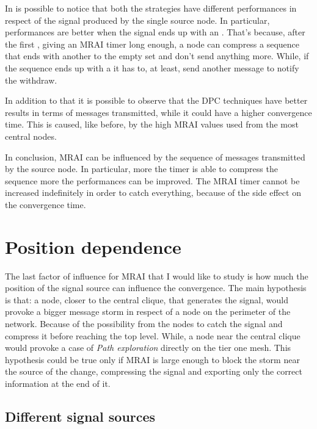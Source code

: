 In  is possible to notice that
both the strategies have different performances in respect of the signal
produced by the single source node.
In particular, performances are better when the signal ends up with an .
That's because, after the first , giving an \ac{MRAI} timer long enough,
a node can compress a sequence that ends with another  to the
empty set and don't send anything more.
While, if the sequence ends up with a  it has to, at least, send another
message to notify the withdraw.

In addition to that it is possible to observe that the \ac{DPC} techniques have better
results in terms of messages transmitted, while it could have a higher
convergence time.
This is caused, like before, by the high \ac{MRAI} values used from the most
central nodes.

In conclusion, \ac{MRAI} can be influenced by the sequence of messages transmitted
by the source node.
In particular, more the timer is able to compress the sequence more the performances
can be improved.
The \ac{MRAI} timer cannot be increased indefinitely in order to catch
everything, because of the side effect on the convergence time.

\section{Position dependence}
\label{sec:position_dependance}

The last factor of influence for \ac{MRAI} that I would like to study is how much
the position of the signal source can influence the convergence.
The main hypothesis is that: a node, closer to the central clique, that generates
the signal, would provoke a bigger message storm in respect of a node on the perimeter
of the network.
Because of the possibility from the nodes to catch the signal and compress it
before reaching the top level.
While, a node near the central clique would provoke a case of \textit{Path exploration}
directly on the tier one mesh.
This hypothesis could be true only if \ac{MRAI} is large enough to block the
storm near the source of the change, compressing the signal and exporting only
the correct information at the end of it.

\subsection{Different signal sources}
\label{subsec:different_destinations}

